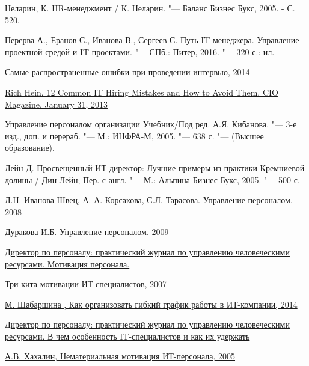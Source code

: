 \documentclass{../industrial-development}
\begin{document}
\begin{thebibliography}{99}
 Неларин, К. HR-менеджмент / К. Неларин. "--- Баланс Бизнес Букс, 2005. - С. 520.

 Перерва А., Еранов С., Иванова В., Сергеев С. Путь IT-менеджера. Управление проектной средой и IT-проектами. "--- СПб.: Питер, 2016. "--- 320 с.: ил.

 \href{http://bishelp.ru/business/personal/samye-rasprostranennye-oshibki-pri-provedenii-intervyu}{Самые распространенные ошибки при проведении интервью, 2014}

 \href{https://www.osp.ru/cio/2013/08/13036953/}{Rich Hein. 12 Common IT Hiring Mistakes and How to Avoid Them. CIO Magazine. January 31, 2013}

 Управление персоналом организации Учебник/Под ред. А.Я. Кибанова. "--- 3-е изд., доп. и перераб. "--- М.: ИНФРА-М, 2005. "--- 638 с. "--- (Высшее образование).

 Лейн Д. Просвещенный ИТ-директор: Лучшие примеры из практики Кремниевой долины / Дин Лейн; Пер. с англ. "--- М.: Альпина Бизнес Букс, 2005. "--- 500 с.

 \href{http://finances.social/upravlenie-personalom_709/modeli-upravleniya-personalom-33032.html} {Л.Н. Иванова-Швец, А. А. Корсакова, С.Л. Тарасова. Управление персоналом. 2008}

 \href{https://textbooks.studio/menedjment-upravlenie-personalom/osnovnyie-elementyi-planirovaniya-26893.html}{Дуракова И.Б. Управление персоналом. 2009}

 \href{https://www.hr-director.ru/rubric/6507-motivatsiya-personala}{Директор по персоналу: практический журнал по управлению человеческими ресурсами. Мотивация персонала.}

 \href{https://www.osp.ru/cio/2007/08/4326047/}{Три кита мотивации ИТ-специалистов, 2007}

 \href{http://saas.ru/cases/~kak-orghanizovat-ghibkii-ghrafik-raboty-v-it-kompanii}{М. Шабаршина , Как организовать гибкий график работы в ИТ-компании, 2014}

 \href{https://www.hr-director.ru/article/63599-qqe-15-m4-v-kompanii-ploho-prijivayutsya-it-spetsialisty}{Директор по персоналу: практический журнал по управлению человеческими ресурсами. В чем особенность IT-специалистов и как их удержать}

 \href{https://www.ippnou.ru/print/001184/}{А.В. Хахалин, Нематериальная мотивация ИТ-персонала, 2005}

\end{thebibliography}
\end{document}
